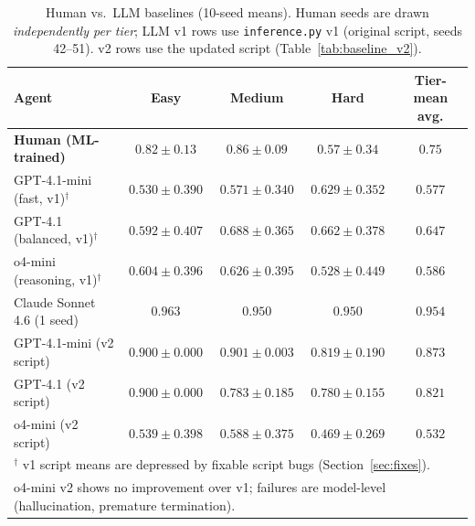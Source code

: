 \documentclass{article}
\begin{document}
\begin{table}[h]
\centering
\caption{Human vs.\ LLM baselines (10-seed means).  Human seeds are drawn
\emph{independently per tier}; LLM v1 rows use \texttt{inference.py} v1
(original script, seeds 42--51).  v2 rows use the updated script
(Table~\ref{tab:baseline_v2}).}
\label{tab:human}
\small
\begin{tabular}{lcccc}
\toprule
\textbf{Agent} & \textbf{Easy} & \textbf{Medium} & \textbf{Hard} & \textbf{Tier-mean avg.} \\
\midrule
\textbf{Human (ML-trained)} & $\mathbf{0.82\pm0.13}$ & $\mathbf{0.86\pm0.09}$ & $\mathbf{0.57\pm0.34}$ & $0.75$ \\
GPT-4.1-mini (fast, v1)$^\dagger$ & $0.530\pm0.390$ & $0.571\pm0.340$ & $0.629\pm0.352$ & $0.577$ \\
GPT-4.1 (balanced, v1)$^\dagger$ & $0.592\pm0.407$ & $0.688\pm0.365$ & $0.662\pm0.378$ & $0.647$ \\
o4-mini (reasoning, v1)$^\dagger$ & $0.604\pm0.396$ & $0.626\pm0.395$ & $0.528\pm0.449$ & $0.586$ \\
Claude Sonnet 4.6 (1 seed)  & $0.963$ & $0.950$ & $0.950$ & $0.954$ \\
\midrule
GPT-4.1-mini (v2 script)    & $0.900\pm0.000$ & $0.901\pm0.003$ & $0.819\pm0.190$ & $0.873$ \\
GPT-4.1 (v2 script)         & $0.900\pm0.000$ & $0.783\pm0.185$ & $0.780\pm0.155$ & $0.821$ \\
o4-mini (v2 script)         & $0.539\pm0.398$ & $0.588\pm0.375$ & $0.469\pm0.269$ & $0.532$ \\
\bottomrule
\multicolumn{5}{l}{\small $^\dagger$ v1 script means are depressed by fixable script bugs (Section~\ref{sec:fixes}).} \\
\multicolumn{5}{l}{\small o4-mini v2 shows no improvement over v1; failures are model-level (hallucination, premature termination).} \\
\end{tabular}
\end{table}
\end{document}
